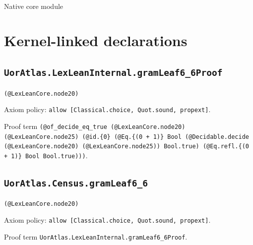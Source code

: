 \documentclass[11pt]{article}
\begin{document}
\begin{center}{\LARGE Native core module}\end{center}
\section*{Kernel-linked declarations}
\subsection*{\texttt{UorAtlas.LexLeanInternal.gramLeaf6\_6Proof}}
\noindent\texttt{(@LexLeanCore.node20)}\par
\noindent Axiom policy: \texttt{allow [Classical.choice, Quot.sound, propext]}.\par
\noindent Proof term \texttt{(@of\_decide\_eq\_true (@LexLeanCore.node20) (@LexLeanCore.node25) (@id.\{0\} (@Eq.\{(0 + 1)\} Bool (@Decidable.decide (@LexLeanCore.node20) (@LexLeanCore.node25)) Bool.true) (@Eq.refl.\{(0 + 1)\} Bool Bool.true)))}.\par
\subsection*{\texttt{UorAtlas.Census.gramLeaf6\_6}}
\noindent\texttt{(@LexLeanCore.node20)}\par
\noindent Axiom policy: \texttt{allow [Classical.choice, Quot.sound, propext]}.\par
\noindent Proof term \texttt{UorAtlas.LexLeanInternal.gramLeaf6\_6Proof}.\par
\end{document}
